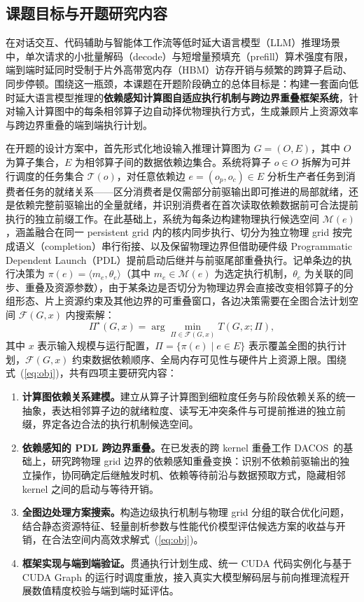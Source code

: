 \subsection{课题目标与开题研究内容}
\label{sec:purpose}

在对话交互、代码辅助与智能体工作流等低时延大语言模型（LLM）推理场景中，单次请求的小批量解码（decode）与短增量预填充（prefill）算术强度有限，端到端时延同时受制于片外高带宽内存（HBM）访存开销与频繁的跨算子启动、同步停顿。围绕这一瓶颈，本课题在开题阶段确立的总体目标是：构建一套面向低时延大语言模型推理的\textbf{依赖感知计算图自适应执行机制与跨边界重叠框架系统}，针对输入计算图中的每条相邻算子边自动择优物理执行方式，生成兼顾片上资源效率与跨边界重叠的端到端执行计划。

在开题的设计方案中，首先形式化地设输入推理计算图为 $G=(O,E)$，其中 $O$ 为算子集合，$E$ 为相邻算子间的数据依赖边集合。系统将算子 $o\in O$ 拆解为可并行调度的任务集合 $\mathcal{T}(o)$，对任意依赖边 $e=(o_p,o_c)\in E$ 分析生产者任务到消费者任务的就绪关系——区分消费者是仅需部分前驱输出即可推进的局部就绪，还是依赖完整前驱输出的全量就绪，并识别消费者在首次读取依赖数据前可合法提前执行的独立前缀工作。在此基础上，系统为每条边构建物理执行候选空间 $\mathcal{M}(e)$，涵盖融合在同一 persistent grid 内的核内同步执行、切分为独立物理 grid 按完成语义（completion）串行衔接、以及保留物理边界但借助硬件级 Programmatic Dependent Launch（PDL）提前启动后继并与前驱尾部重叠执行。记单条边的执行决策为 $\pi(e)=\langle m_e,\theta_e\rangle$（其中 $m_e\in\mathcal{M}(e)$ 为选定执行机制，$\theta_e$ 为关联的同步、重叠及资源参数），由于某条边是否切分为物理边界会直接改变相邻算子的分组形态、片上资源约束及其他边界的可重叠窗口，各边决策需要在全图合法计划空间 $\mathcal{F}(G,x)$ 内搜索解：
\begin{equation}
\Pi^{\star}(G,x)=\arg\min_{\Pi\in\mathcal{F}(G,x)} T(G,x;\Pi), \label{eq:obj}
\end{equation}
其中 $x$ 表示输入规模与运行配置，$\Pi=\{\pi(e)\mid e\in E\}$ 表示覆盖全图的执行计划，$\mathcal{F}(G,x)$ 约束数据依赖顺序、全局内存可见性与硬件片上资源上限。围绕式~(\ref{eq:obj})，共有四项主要研究内容：
\begin{enumerate}[leftmargin=2.4em,itemsep=2pt]
\item \textbf{计算图依赖关系建模。}建立从算子计算图到细粒度任务与阶段依赖关系的统一抽象，表达相邻算子边的就绪粒度、读写无冲突条件与可提前推进的独立前缀，界定各边合法的执行机制候选空间。
\item \textbf{依赖感知的 PDL 跨边界重叠。}在已发表的跨 kernel 重叠工作 DACOS~\pDacos 的基础上，研究跨物理 grid 边界的依赖感知重叠变换：识别不依赖前驱输出的独立操作，协同确定后继触发时机、依赖等待前沿与数据预取方式，隐藏相邻 kernel 之间的启动与等待开销。
\item \textbf{全图边处理方案搜索。}构造边级执行机制与物理 grid 分组的联合优化问题，结合静态资源特征、轻量剖析参数与性能代价模型评估候选方案的收益与开销，在合法空间内高效求解式~(\ref{eq:obj})。
\item \textbf{框架实现与端到端验证。}贯通执行计划生成、统一 CUDA 代码实例化与基于 CUDA Graph 的运行时调度重放，接入真实大模型解码层与前向推理流程开展数值精度校验与端到端时延评估。
\end{enumerate}

